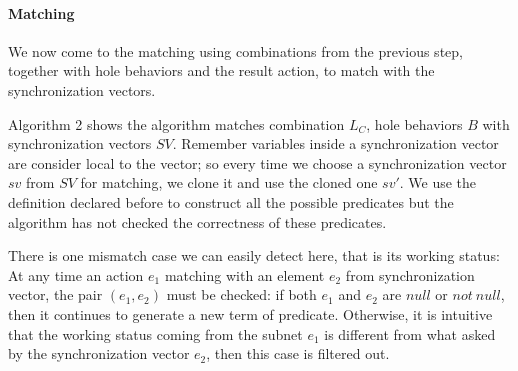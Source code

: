 \documentclass{lncs/llncs}
\begin{document}
\paragraph{Matching}

We now come to the matching using combinations from the previous step, together with hole behaviors and the result action, to match with the synchronization vectors. 

Algorithm 2 shows the algorithm matches combination $L_C$, hole
behaviors $B$ with synchronization vectors $SV$. Remember variables
inside a synchronization vector are consider local to the vector; so every time we choose a synchronization vector $sv$ from $SV$ for matching, we clone it and use the cloned one $sv'$. We use the definition declared before to construct all the possible predicates but the algorithm has not checked the correctness of these predicates. 

There is one mismatch case we can easily detect here, that is its
working status:
At any time an action $e_1$ matching with an element $e_2$ from
synchronization vector, the pair $(e_1, e_2)$ must be checked: if both
$e_1$ and $e_2$ are $null$ or $not\ null$, then it continues to
generate a new term of predicate. Otherwise, it is intuitive that the
working status coming from the subnet $e_1$ is different from what
asked by the synchronization vector $e_2$, then this case is filtered
out.
\end{document}

